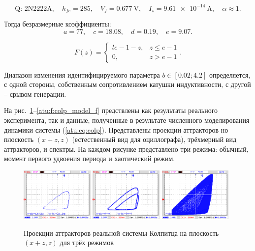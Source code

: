 \documentclass[a4paper,12pt]{article}
\begin{document}
\[
  \text{Q: 2N2222A}, \quad
  h_{fe}=285, \quad
  V_f = \SI{0.677}{\volt}, \quad
  I_s = \SI{9.61e-14}{\ampere}, \quad
  \alpha \approx 1.
\]

Тогда безразмерные коэффициенты:
\[
 a = 77,     \quad
 c = 18.08,  \quad
 d = 0.19,   \quad
 e = 9.07.
\]

\[
F(z) =
\begin{cases}{l}
  e-1-z, & z \le e-1  \\
  0,     & z  >  e-1
\end{cases}.
\]


Диапазон изменения идентифицируемого параметра
$b \in [ 0.02; 4.2 ]$
определяется, с одной стороны, собственным сопротивлением катушки индуктивности,
с другой -- срывом генерации.


На рис.~\ref{atu:f:colp_real_xzz}--\ref{atu:f:colp_model_f} предствлены как результаты реального эксперимента,
так и данные, полученные в результате численного моделирования динамики системы (\ref{atu:eq:colp}).
Представлены проекции аттракторов но плоскость $(x+z,z)$ (естественный вид для оциллографа),
трёхмерный вид аттракторов, и спектры.
На каждом рисунке представлено три режима: обычный, момент первого удвоения периода и хаотический режим.


\begin{figure}[htb!]
 \centerline{
   \includegraphics[width=0.32\textwidth]{p/cha/colp/colp_m1_vv.png}
   \includegraphics[width=0.32\textwidth]{p/cha/colp/colp_m2_vv.png}
   \includegraphics[width=0.32\textwidth]{p/cha/colp/colp_m3_vv_ac.png}
 }
  \caption{Проекции аттракторов реальной системы Колпитца на плоскость $(x+z,z)$
  для трёх режимов}
  \label{atu:f:colp_real_xzz}
\end{figure}
\end{document}
